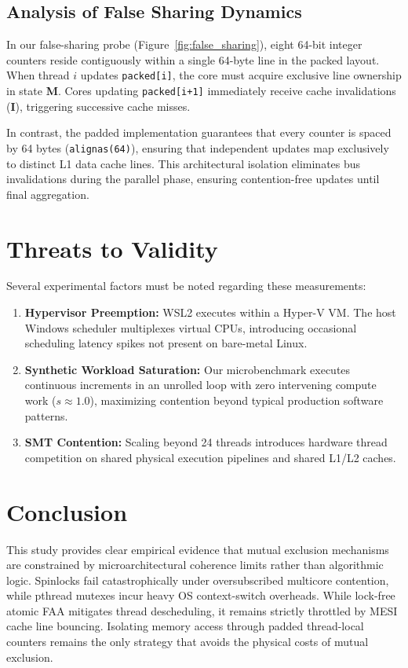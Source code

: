 \documentclass[conference]{IEEEtran}
\begin{document}
\subsection{Analysis of False Sharing Dynamics}
In our false-sharing probe (Figure~\ref{fig:false_sharing}), eight 64-bit integer counters reside contiguously within a single 64-byte line in the packed layout. When thread $i$ updates \texttt{packed[i]}, the core must acquire exclusive line ownership in state \textbf{M}. Cores updating \texttt{packed[i+1]} immediately receive cache invalidations (\textbf{I}), triggering successive cache misses.

In contrast, the padded implementation guarantees that every counter is spaced by 64 bytes (\texttt{alignas(64)}), ensuring that independent updates map exclusively to distinct L1 data cache lines. This architectural isolation eliminates bus invalidations during the parallel phase, ensuring contention-free updates until final aggregation.

\section{Threats to Validity}
Several experimental factors must be noted regarding these measurements:
\begin{enumerate}
    \item \textbf{Hypervisor Preemption:} WSL2 executes within a Hyper-V VM. The host Windows scheduler multiplexes virtual CPUs, introducing occasional scheduling latency spikes not present on bare-metal Linux.
    \item \textbf{Synthetic Workload Saturation:} Our microbenchmark executes continuous increments in an unrolled loop with zero intervening compute work ($s \approx 1.0$), maximizing contention beyond typical production software patterns.
    \item \textbf{SMT Contention:} Scaling beyond 24 threads introduces hardware thread competition on shared physical execution pipelines and shared L1/L2 caches.
\end{enumerate}

\section{Conclusion}
This study provides clear empirical evidence that mutual exclusion mechanisms are constrained by microarchitectural coherence limits rather than algorithmic logic. Spinlocks fail catastrophically under oversubscribed multicore contention, while pthread mutexes incur heavy OS context-switch overheads. While lock-free atomic FAA mitigates thread descheduling, it remains strictly throttled by MESI cache line bouncing. Isolating memory access through padded thread-local counters remains the only strategy that avoids the physical costs of mutual exclusion.
\end{document}
